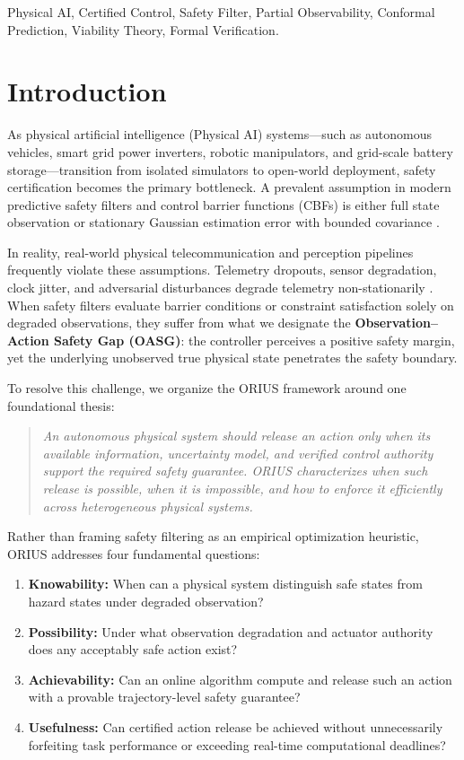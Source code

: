 \documentclass[conference]{IEEEtran}
\begin{document}
\begin{IEEEkeywords}
Physical AI, Certified Control, Safety Filter, Partial Observability, Conformal Prediction, Viability Theory, Formal Verification.
\end{IEEEkeywords}

\section{Introduction}
As physical artificial intelligence (Physical AI) systems---such as autonomous vehicles, smart grid power inverters, robotic manipulators, and grid-scale battery storage---transition from isolated simulators to open-world deployment, safety certification becomes the primary bottleneck. A prevalent assumption in modern predictive safety filters and control barrier functions (CBFs) is either full state observation or stationary Gaussian estimation error with bounded covariance \cite{annurev_safety_filter_2024,ames_cbf_2019}. 

In reality, real-world physical telecommunication and perception pipelines frequently violate these assumptions. Telemetry dropouts, sensor degradation, clock jitter, and adversarial disturbances degrade telemetry non-stationarily \cite{romano_cqr_2019,gibbs_aci_2021}. When safety filters evaluate barrier conditions or constraint satisfaction solely on degraded observations, they suffer from what we designate the \textbf{Observation--Action Safety Gap (OASG)}: the controller perceives a positive safety margin, yet the underlying unobserved true physical state penetrates the safety boundary.

To resolve this challenge, we organize the ORIUS framework around one foundational thesis:
\begin{quote}
\textit{An autonomous physical system should release an action only when its available information, uncertainty model, and verified control authority support the required safety guarantee. ORIUS characterizes when such release is possible, when it is impossible, and how to enforce it efficiently across heterogeneous physical systems.}
\end{quote}

Rather than framing safety filtering as an empirical optimization heuristic, ORIUS addresses four fundamental questions:
\begin{enumerate}
    \item \textbf{Knowability:} When can a physical system distinguish safe states from hazard states under degraded observation?
    \item \textbf{Possibility:} Under what observation degradation and actuator authority does any acceptably safe action exist?
    \item \textbf{Achievability:} Can an online algorithm compute and release such an action with a provable trajectory-level safety guarantee?
    \item \textbf{Usefulness:} Can certified action release be achieved without unnecessarily forfeiting task performance or exceeding real-time computational deadlines?
\end{enumerate}
\end{document}
